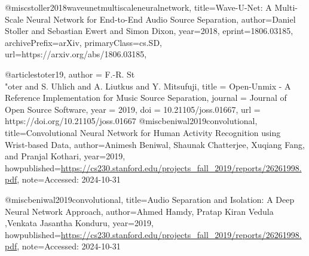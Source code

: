 
@misc{stoller2018waveunetmultiscaleneuralnetwork,
      title={Wave-U-Net: A Multi-Scale Neural Network for End-to-End Audio Source Separation}, 
      author={Daniel Stoller and Sebastian Ewert and Simon Dixon},
      year={2018},
      eprint={1806.03185},
      archivePrefix={arXiv},
      primaryClass={cs.SD},
      url={https://arxiv.org/abs/1806.03185}, 
}

@article{stoter19,  
  author        = {F.-R. St\\"oter and 
                   S. Uhlich and 
                   A. Liutkus and 
                   Y. Mitsufuji},  
  title         = {Open-Unmix - A Reference Implementation 
                   for Music Source Separation},
  journal       = {Journal of Open Source Software},  
  year          = 2019,
  doi           = {10.21105/joss.01667},
  url           = {https://doi.org/10.21105/joss.01667}
@misc{beniwal2019convolutional,
    title={Convolutional Neural Network for Human Activity Recognition using
Wrist-based Data},
    author={Animesh Beniwal, Shaunak Chatterjee, Xuqiang Fang, and Pranjal
Kothari},
    year={2019},
    howpublished={\url{https://cs230.stanford.edu/projects_fall_2019/reports/26261998.pdf}},
    note={Accessed: 2024-10-31}
}}

@misc{beniwal2019convolutional,
    title={Audio Separation and Isolation: A Deep Neural
Network Approach},
    author={Ahmed Hamdy, Pratap Kiran Vedula ,Venkata Jasantha Konduru},
    year={2019},
    howpublished={\url{https://cs230.stanford.edu/projects_fall_2019/reports/26261998.pdf}},
    note={Accessed: 2024-10-31}
}
